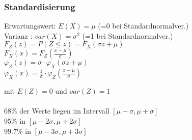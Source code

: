 \subsubsection{Standardisierung}
\begin{multicols}{2}
	Erwartungswert: $E(X)=\mu$ \hspace{4mm}(=0 bei Standardnormalver.)\\ 
	Varianz \hspace{11.5mm}: $var(X)=\sigma^2$ (=1 bei Standardnormalver.)\\
	
	$F_Z(z) = P(Z \leq z) = F_X(\sigma z + \mu)$ \\
	$F_X(x) = F_Z(\frac{x-\mu}{\sigma})$\\
	$\varphi_Z(z) = \sigma \cdot \varphi_X(\sigma z + \mu)$\\
	$\varphi_X(x) = \frac{1}{\sigma} \cdot \varphi_Z(\frac{x - \mu}{\sigma})$ 
	\columnbreak

	 \hspace{5mm} mit $E(Z) = 0$ und $var(Z) = 1$\\ \\
	
	$68\% $ der Werte liegen im Intervall $[ \mu - \sigma, \mu + \sigma]$ \\ 
	$95\% $ in $[ \mu - 2\sigma, \mu + 2\sigma]$ \\
	$99.7\% $ in $[ \mu - 3\sigma, \mu + 3\sigma]$

\end{multicols}

